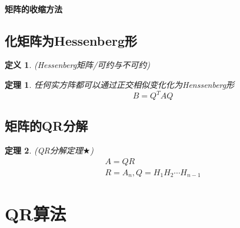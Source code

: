 \documentclass[twoside]{article}
\newtheorem{theorem}{定理}[section]
\newtheorem{definition}{定义}[section]
\begin{document}
\paragraph{矩阵的收缩方法}
\subsection{化矩阵为Hessenberg形}
\begin{definition}
  (Hessenberg矩阵/可约与不可约)
\end{definition}
\begin{theorem}
  任何实方阵都可以通过正交相似变化化为Henssenberg形
  \begin{equation}
    B=Q^T AQ
  \end{equation}
\end{theorem}
\subsection{矩阵的QR分解}
\begin{theorem}
  (QR分解定理$\bigstar$)
  \begin{equation}
    \begin{aligned}
      A=QR \\
      R=A_n, Q=H_1 H_2 \cdots H_{n-1}
    \end{aligned}
  \end{equation}
\end{theorem}

\section{QR算法}
\end{document}
